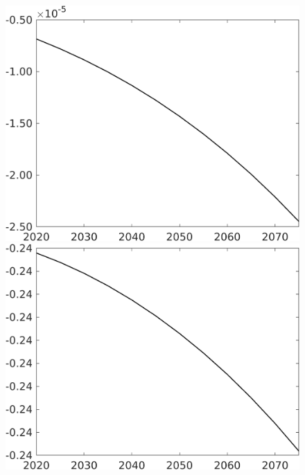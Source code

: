 \begin{figure}[h!!]
\begin{minipage}[]{0.32\textwidth}
	\end{minipage}
	\begin{minipage}[]{0.32\textwidth}
		\includegraphics[width=1\textwidth]{../../codding_model/own_basedOnFried/optimalPol_010922_revision/figures/all_13Sept22/CompTaufPER_bytaul_Reg0_snS_spillover0_nsk0_xgr0_knspil0_sep0_LFlimit0_emsbase0_countec0_GovRev0_etaa0.79_lgd0.png}
	\end{minipage}
	\begin{minipage}[]{0.32\textwidth}
		\includegraphics[width=1\textwidth]{../../codding_model/own_basedOnFried/optimalPol_010922_revision/figures/all_13Sept22/CompTaufPER_bytaul_Reg0_sgsff_spillover0_nsk0_xgr0_knspil0_sep0_LFlimit0_emsbase0_countec0_GovRev0_etaa0.79_lgd0.png}

\end{minipage}
\end{figure}
